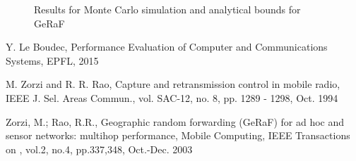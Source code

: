 \documentclass[10pt]{article}
\begin{document}
\begin{figure}[H]
  \centering
  \caption{Results for Monte Carlo simulation and analytical bounds for GeRaF}
  \label{fig:geraf2}
\end{figure}



\FloatBarrier

\begin{thebibliography}{10}

Y. Le Boudec, Performance Evaluation of Computer and Communications Systems, EPFL, 2015

M. Zorzi and R. R. Rao, Capture and retransmission control in
mobile radio, IEEE J. Sel. Areas Commun., vol. SAC-12, no. 8, pp.
1289 - 1298, Oct. 1994

Zorzi, M.; Rao, R.R., Geographic random forwarding (GeRaF) for ad hoc and sensor networks: multihop performance, Mobile Computing, IEEE Transactions on , vol.2, no.4, pp.337,348, Oct.-Dec. 2003


\end{thebibliography}
\end{document}
